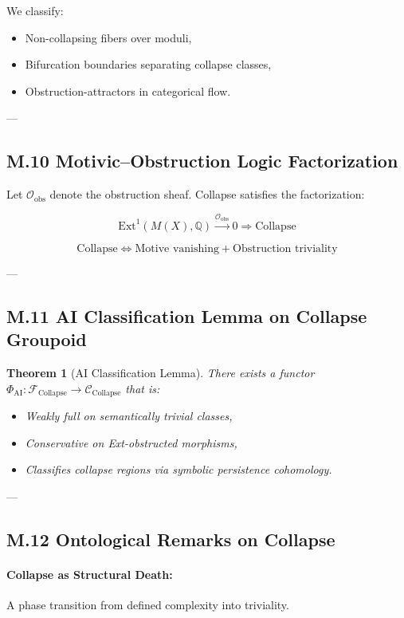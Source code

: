 \documentclass[11pt]{article}
\newtheorem{theorem}{Theorem}[section]
\begin{document}
\begin{axiom}
\begin{axiom}
{{We classify:

\begin{itemize}
  \item Non-collapsing fibers over moduli,
  \item Bifurcation boundaries separating collapse classes,
  \item Obstruction-attractors in categorical flow.
\end{itemize}

---

\subsection*{M.10 Motivic–Obstruction Logic Factorization}

Let $\mathcal{O}_{\text{obs}}$ denote the obstruction sheaf.  
Collapse satisfies the factorization:

\[
\mathrm{Ext}^1(M(X),\mathbb{Q}) \overset{\mathcal{O}_{\text{obs}}}{\longrightarrow} 0 \Rightarrow \text{Collapse}
\]

\[
\text{Collapse} \Longleftrightarrow \text{Motive vanishing} + \text{Obstruction triviality}
\]

---

\subsection*{M.11 AI Classification Lemma on Collapse Groupoid}

\begin{theorem}[AI Classification Lemma]
There exists a functor $\Phi_{\text{AI}}: \mathcal{F}_{\text{Collapse}} \to \mathcal{C}_{\text{Collapse}}$  
that is:

\begin{itemize}
  \item Weakly full on semantically trivial classes,
  \item Conservative on Ext-obstructed morphisms,
  \item Classifies collapse regions via symbolic persistence cohomology.
\end{itemize}
\end{theorem}

---

\subsection*{M.12 Ontological Remarks on Collapse}

\paragraph{Collapse as Structural Death:}  
A phase transition from defined complexity into triviality.

}}
\end{axiom}
\end{axiom}
\end{document}
